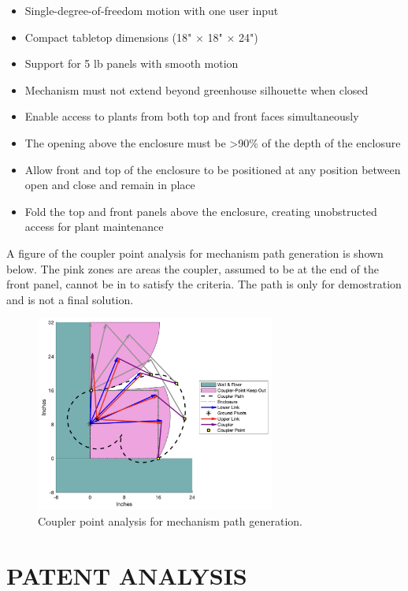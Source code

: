 \documentclass[12pt]{article}
\begin{document}
\begin{itemize}
    \item Single-degree-of-freedom motion with one user input
    \item Compact tabletop dimensions (18" × 18" × 24")
    \item Support for 5 lb panels with smooth motion
    \item Mechanism must not extend beyond greenhouse silhouette when closed
    \item Enable access to plants from both top and front faces simultaneously
    \item The opening above the enclosure must be >90\% of the depth of the enclosure
    \item Allow front and top of the enclosure to be positioned at any position between open and close and remain in place
    \item Fold the top and front panels above the enclosure, creating unobstructed access for plant maintenance
\end{itemize}

A figure of the coupler point analysis for mechanism path generation is shown below. The pink zones are areas the coupler, assumed to be at the end of the front panel, cannot be in to satisfy the criteria. The path is only for demostration and is not a final solution.

\begin{figure}[H]
    \centering
    \includegraphics[width=0.7\textwidth]{../03_Images/Coupler Points.png}
    \caption{Coupler point analysis for mechanism path generation.}
    \label{fig:coupler_points}
\end{figure}

\section*{PATENT ANALYSIS}
\end{document}
